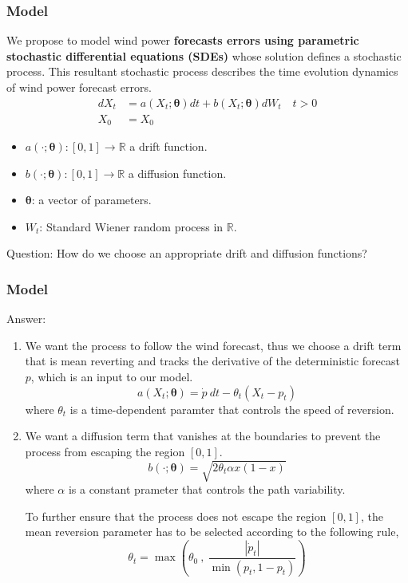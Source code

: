 \documentclass[aspectratio=169]{beamer}\usepackage[utf8]{inputenc}
\newcommand{\R}{\mathbb{R}}
\begin{document}
\begin{frame}\frametitle{Model}
We propose to model wind power\textbf{ forecasts errors using parametric stochastic differential equations (SDEs)} whose solution defines a stochastic process. This resultant stochastic process describes the time evolution dynamics of wind power forecast errors.
\begin{equation}
\begin{split}
dX_t &= a(X_t; \bm{\theta}) dt + b (X_t; \bm{\theta} ) dW_t \quad t > 0 \\
X_0 & = X_0
\end{split}
\label{main}
\end{equation}

\begin{itemize}
\item $a(\cdot; \bm{\theta}):[0,1] \to \R $  a drift function.
\item $b (\cdot; \bm{\theta} ):[0,1] \to \R$  a  diffusion function.
\item $\bm{\theta}$: a vector of parameters.
\item $W_t$: Standard Wiener random process in $\R$.
\end{itemize}

Question: How do we choose an appropriate drift and diffusion functions?

\end{frame}


\begin{frame}\frametitle{Model}
Answer:
\begin{enumerate}
  \item We want the process to follow the wind forecast, thus we choose a drift term that is mean reverting and tracks the derivative of the deterministic forecast $p$, which is an input to our model.
  \begin{equation}
    a(X_t; \bm{\theta})=  \dot{p} \ dt - \theta_t(X_t - p_t)
  \end{equation}
where $\theta_t$ is a time-dependent paramter that controls the speed of reversion.
  \item We want a diffusion term that vanishes at the boundaries to prevent the process from escaping the region $[0,1]$.
  \begin{equation}
    b (\cdot; \bm{\theta} )= \sqrt{2 \theta_t \alpha x (1-x)}
  \end{equation}
  where $\alpha$ is a constant prameter that controls the path variability.

To further ensure that the process does not escape the region $[0,1]$, the mean reversion parameter has to be selected according to the following rule,
\begin{equation}
\theta_t = \max \left( \theta_0 \ , \ \frac{|\dot{p}_t|}{\min (p_t, 1-p_t)}  \right ) \label{theta_t}
\end{equation}
\end{enumerate}
\end{frame}
\end{document}
